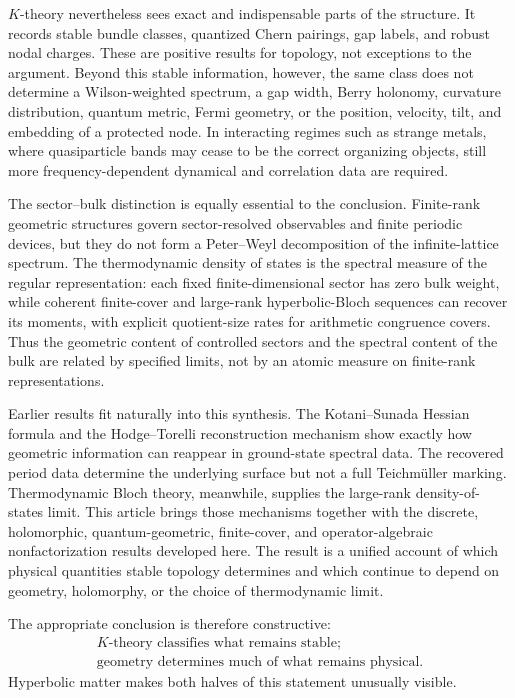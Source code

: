\documentclass[11pt]{article}
\theoremstyle{definition}
\theoremstyle{remark}
\begin{document}
\(K\)-theory nevertheless sees exact and indispensable parts of the
structure.  It records stable bundle classes, quantized Chern pairings, gap
labels, and robust nodal charges.  These are positive results for topology,
not exceptions to the argument.  Beyond this stable information, however, the
same class does not determine a Wilson-weighted spectrum, a gap width, Berry
holonomy, curvature distribution, quantum metric, Fermi geometry, or the
position, velocity, tilt, and embedding of a protected node.  In interacting
regimes such as strange metals, where quasiparticle bands may cease to be the
correct organizing objects, still more frequency-dependent dynamical and
correlation data are required.

The sector--bulk distinction is equally essential to the conclusion.
Finite-rank geometric structures govern sector-resolved observables and
finite periodic devices, but they do not form a Peter--Weyl decomposition of
the infinite-lattice spectrum.  The thermodynamic density of states is the
spectral measure of the regular representation: each fixed
finite-dimensional sector has zero bulk weight, while coherent finite-cover
and large-rank hyperbolic-Bloch sequences can recover its moments, with
explicit quotient-size rates for arithmetic congruence covers.  Thus the
geometric content of controlled sectors and the spectral content of the bulk
are related by specified limits, not by an atomic measure on finite-rank
representations.

Earlier results fit naturally into this synthesis.  The Kotani--Sunada
Hessian formula and the Hodge--Torelli reconstruction mechanism show exactly
how geometric information can reappear in ground-state spectral data.  The
recovered period data determine the underlying surface but not a full
Teichm\"uller marking.  Thermodynamic Bloch theory, meanwhile, supplies the
large-rank density-of-states limit.  This article brings those mechanisms
together with the discrete, holomorphic, quantum-geometric, finite-cover, and
operator-algebraic nonfactorization results developed here.  The result is a
unified account of which physical quantities stable topology determines and
which continue to depend on geometry, holomorphy, or the choice of
thermodynamic limit.

The appropriate conclusion is therefore constructive:
\[
\boxed{\begin{gathered}
\text{\(K\)-theory classifies what remains stable;}\\[-1mm]
\text{geometry determines much of what remains physical.}
\end{gathered}}
\]
Hyperbolic matter makes both halves of this statement unusually visible.
\end{document}
